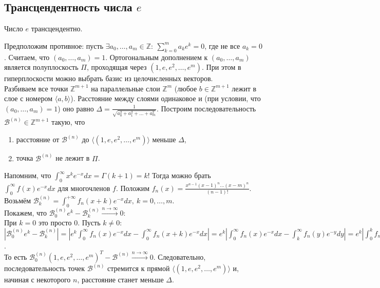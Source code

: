 \subsection{Трансцендентность числа $e$}
\begin{theorem}
	Число $e$ трансцендентно.
\end{theorem}
\begin{pf}
	Предположим противное: пусть $\displaystyle \exists a_0,\dots,a_m \in \mathbb{Z}: \ \sum\limits_{k=0}^m a_ke^k = 0$, где не все $a_k = 0$.
	Считаем, что $\left( a_0, \dots, a_m \right)=1$. Ортогональным дополнением к $\left( a_0, \dots, a_m \right)$ является полуплоскость $\Pi$, проходящая через $\left( 1, e, e^2, \dots, e^m \right)$. При этом в гиперплоскости можно выбрать базис из целочисленных векторов.\\
	Разбиваем все точки $\mathbb{Z}^{m+1}$ на параллельные слои $\mathbb{Z}^m$ (любое $b \in \mathbb{Z}^{m+1}$ лежит в слое с номером $\langle a,b \rangle$). Расстояние между слоями одинаковое и (при условии, что $(a_0,\dots,a_m) = 1$) оно равно $\displaystyle \Delta = \frac{1}{\sqrt{a_0^2 + a_1^2 +\dots+ a_m^2}}$. Построим последовательность $\mathcal{B}^{(n)} \in \mathbb{Z}^{m+1}$ такую, что
	\begin{enumerate}[nolistsep]
		\item[1)] расстояние от $\mathcal{B}^{(n)}$ до $\langle \left(1,e,e^2,\dots,e^m\right) \rangle$ меньше $\Delta$,
		\item[2)] точка $\mathcal{B}^{(n)}$ не лежит в $\Pi$.
	\end{enumerate}
	Напомним, что $\displaystyle \int_0^\infty x^ke^{-x}dx = \Gamma(k+1) = k!$ Тогда можно брать $\displaystyle \int_0^\infty f(x)e^{-x}dx$ для многочленов $f$. Положим $\displaystyle f_n(x) = \frac{x^{n-1}(x-1)^n\dots(x-m)^n}{(n-1)!}$. Возьмём $\displaystyle \mathcal{B}_k^{(n)} = \int_0^{+\infty} f_n(x+k)e^{-x}dx, \ k=0,\dots,m$.\\ Покажем, что $\mathcal{B}_0^{(n)}e^k - \mathcal{B}_k^{(n)} \xrightarrow{n \to \infty} 0$:\\
	При $k=0$ это просто $0$. Пусть $k \ne 0$: $\displaystyle \left| \mathcal{B}_0^{(n)}e^k - \mathcal{B}_k^{(n)} \right| = \left| e^k\int_0^\infty f_n(x)e^{-x}dx - \int_0^\infty f_n(x+k)e^{-x}dx \right| = e^k \left| \int_0^\infty f_n(x)e^{-x}dx - \int_k^\infty f_n(y)e^{-y}dy \right| = e^k \left| \int_0^k f_n(x)e^{-x}dx \right| \leq e^m m \frac{m^{n+nm-1}}{(n-1)!} = \frac{e^m m^{m(n+1)}}{(n-1)!} \xrightarrow{n \to \infty} 0$.\\
	То есть $\mathcal{B}_0^{(n)}\left( 1, e, e^2, \dots, e^m \right)^T - \mathcal{B}^{(n)} \xrightarrow{n \to \infty} 0$. Следовательно, последовательность точек $\mathcal{B}^{(n)}$ стремится к прямой $\langle \left( 1, e, e^2, \dots, e^m \right) \rangle$ и, начиная с некоторого $n$, расстояние станет меньше $\Delta$.\\

\end{pf}
